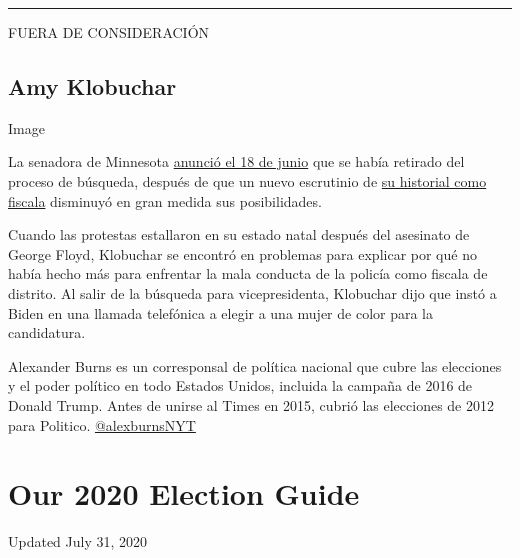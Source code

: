 \begin{center}\rule{0.5\linewidth}{\linethickness}\end{center}

FUERA DE CONSIDERACIÓN

\hypertarget{amy-klobuchar}{%
\subsection{Amy Klobuchar}\label{amy-klobuchar}}

Image

La senadora de Minnesota
\href{https://www.nytimes.com/2020/06/18/us/politics/amy-klobuchar-biden-vice-president.html}{anunció
el 18 de junio} que se había retirado del proceso de búsqueda, después
de que un nuevo escrutinio de
\href{https://www.nytimes.com/2020/05/29/us/politics/klobuchar-minneapolis-george-floyd.html}{su
historial como fiscala} disminuyó en gran medida sus posibilidades.

Cuando las protestas estallaron en su estado natal después del asesinato
de George Floyd, Klobuchar se encontró en problemas para explicar por
qué no había hecho más para enfrentar la mala conducta de la policía
como fiscala de distrito. Al salir de la búsqueda para vicepresidenta,
Klobuchar dijo que instó a Biden en una llamada telefónica a elegir a
una mujer de color para la candidatura.

Alexander Burns es un corresponsal de política nacional que cubre las
elecciones y el poder político en todo Estados Unidos, incluida la
campaña de 2016 de Donald Trump. Antes de unirse al Times en 2015,
cubrió las elecciones de 2012 para Politico.
\href{https://twitter.com/alexburnsNYT}{@alexburnsNYT}

\hypertarget{our-2020-election-guide}{%
\section{Our 2020 Election Guide}\label{our-2020-election-guide}}

Updated July 31, 2020

